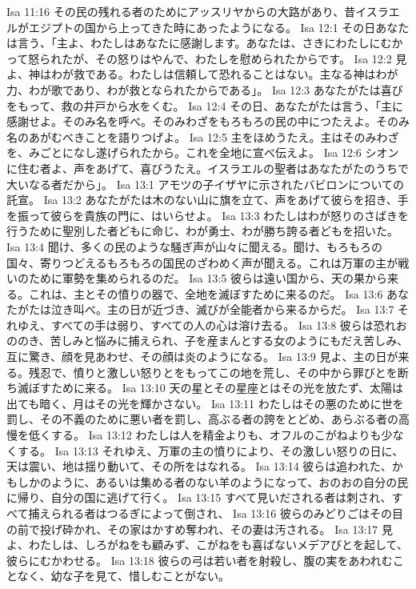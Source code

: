 Isa 11:16  その民の残れる者のためにアッスリヤからの大路があり、昔イスラエルがエジプトの国から上ってきた時にあったようになる。
Isa 12:1  その日あなたは言う、「主よ、わたしはあなたに感謝します。あなたは、さきにわたしにむかって怒られたが、その怒りはやんで、わたしを慰められたからです。
Isa 12:2  見よ、神はわが救である。わたしは信頼して恐れることはない。主なる神はわが力、わが歌であり、わが救となられたからである」。
Isa 12:3  あなたがたは喜びをもって、救の井戸から水をくむ。
Isa 12:4  その日、あなたがたは言う、「主に感謝せよ。そのみ名を呼べ。そのみわざをもろもろの民の中につたえよ。そのみ名のあがむべきことを語りつげよ。
Isa 12:5  主をほめうたえ。主はそのみわざを、みごとになし遂げられたから。これを全地に宣べ伝えよ。
Isa 12:6  シオンに住む者よ、声をあげて、喜びうたえ。イスラエルの聖者はあなたがたのうちで大いなる者だから」。
Isa 13:1  アモツの子イザヤに示されたバビロンについての託宣。
Isa 13:2  あなたがたは木のない山に旗を立て、声をあげて彼らを招き、手を振って彼らを貴族の門に、はいらせよ。
Isa 13:3  わたしはわが怒りのさばきを行うために聖別した者どもに命じ、わが勇士、わが勝ち誇る者どもを招いた。
Isa 13:4  聞け、多くの民のような騒ぎ声が山々に聞える。聞け、もろもろの国々、寄りつどえるもろもろの国民のざわめく声が聞える。これは万軍の主が戦いのために軍勢を集められるのだ。
Isa 13:5  彼らは遠い国から、天の果から来る。これは、主とその憤りの器で、全地を滅ぼすために来るのだ。
Isa 13:6  あなたがたは泣き叫べ。主の日が近づき、滅びが全能者から来るからだ。
Isa 13:7  それゆえ、すべての手は弱り、すべての人の心は溶け去る。
Isa 13:8  彼らは恐れおののき、苦しみと悩みに捕えられ、子を産まんとする女のようにもだえ苦しみ、互に驚き、顔を見あわせ、その顔は炎のようになる。
Isa 13:9  見よ、主の日が来る。残忍で、憤りと激しい怒りとをもってこの地を荒し、その中から罪びとを断ち滅ぼすために来る。
Isa 13:10  天の星とその星座とはその光を放たず、太陽は出ても暗く、月はその光を輝かさない。
Isa 13:11  わたしはその悪のために世を罰し、その不義のために悪い者を罰し、高ぶる者の誇をとどめ、あらぶる者の高慢を低くする。
Isa 13:12  わたしは人を精金よりも、オフルのこがねよりも少なくする。
Isa 13:13  それゆえ、万軍の主の憤りにより、その激しい怒りの日に、天は震い、地は揺り動いて、その所をはなれる。
Isa 13:14  彼らは追われた、かもしかのように、あるいは集める者のない羊のようになって、おのおの自分の民に帰り、自分の国に逃げて行く。
Isa 13:15  すべて見いだされる者は刺され、すべて捕えられる者はつるぎによって倒され、
Isa 13:16  彼らのみどりごはその目の前で投げ砕かれ、その家はかすめ奪われ、その妻は汚される。
Isa 13:17  見よ、わたしは、しろがねをも顧みず、こがねをも喜ばないメデアびとを起して、彼らにむかわせる。
Isa 13:18  彼らの弓は若い者を射殺し、腹の実をあわれむことなく、幼な子を見て、惜しむことがない。
